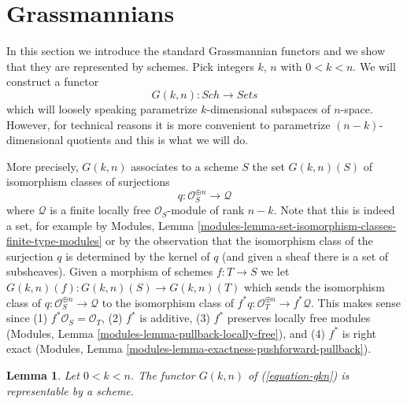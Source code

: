 \documentclass{stacks-project}
\theoremstyle{plain}
\newtheorem{lemma}[subsection]{Lemma}
\theoremstyle{definition}
\theoremstyle{remark}
\numberwithin{equation}{subsection}
\def\Sch{\mathit{Sch}}
\begin{document}
\section{Grassmannians}
\label{section-grassmannian}

\noindent
In this section we introduce the standard Grassmannian functors and
we show that they are represented by schemes. Pick integers $k$, $n$
with $0 < k < n$. We will construct a functor
\begin{equation}
\label{equation-gkn}
G(k, n) : \Sch \longrightarrow \textit{Sets}
\end{equation}
which will loosely speaking parametrize $k$-dimensional subspaces
of $n$-space. However, for technical reasons it is more convenient
to parametrize $(n - k)$-dimensional quotients and this is what we will
do.

\medskip\noindent
More precisely, $G(k, n)$ associates to a scheme $S$ the set $G(k, n)(S)$
of isomorphism classes of surjections
$$
q : \mathcal{O}_S^{\oplus n} \longrightarrow \mathcal{Q}
$$
where $\mathcal{Q}$ is a finite locally free $\mathcal{O}_S$-module
of rank $n - k$. Note that this is indeed a set, for example by
Modules, Lemma \ref{modules-lemma-set-isomorphism-classes-finite-type-modules}
or by the observation that the isomorphism class of the surjection $q$
is determined by the kernel of $q$ (and given a sheaf there is a set
of subsheaves). Given a morphism of schemes $f : T \to S$ we let
$G(k, n)(f) : G(k, n)(S) \to G(k, n)(T)$ which sends the
isomorphism class of $q : \mathcal{O}_S^{\oplus n} \longrightarrow \mathcal{Q}$
to the isomorphism class of
$f^*q : \mathcal{O}_T^{\oplus n} \longrightarrow f^*\mathcal{Q}$.
This makes sense since  (1) $f^*\mathcal{O}_S = \mathcal{O}_T$,
(2) $f^*$ is additive, (3) $f^*$ preserves locally free modules
(Modules, Lemma \ref{modules-lemma-pullback-locally-free}),
and (4) $f^*$ is right exact
(Modules, Lemma \ref{modules-lemma-exactness-pushforward-pullback}).

\begin{lemma}
\label{lemma-gkn-representable}
Let $0 < k < n$.
The functor $G(k, n)$ of (\ref{equation-gkn}) is representable by a scheme.
\end{lemma}
\end{document}
